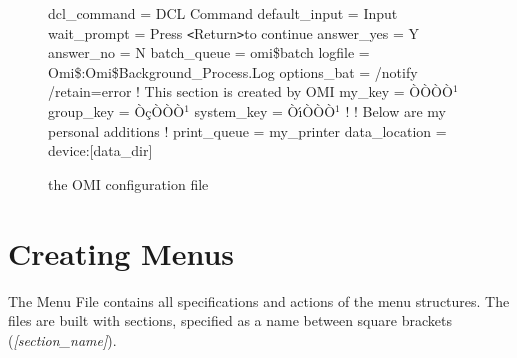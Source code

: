\documentclass[a4paper]{book}
\newcommand{\lt}{\texttt{<}}
\newcommand{\gt}{\texttt{>}}
\renewcommand{\indent}{\hspace*{5mm}}
\begin{document}
\begin{figure}[ht]
\begin{minipage}[t]{\textwidth}
\begin{ttfamily}
\indent dcl{\_}command = DCL Command \newline
\indent default{\_}input = Input \newline
\indent wait{\_}prompt = Press \lt Return\gt  to continue \newline
\indent answer{\_}yes = Y \newline
\indent answer{\_}no = N \newline
 \newline
\noindent[bgrprocess] \newline
\indent batch{\_}queue = omi{\$}batch \newline
\indent logfile = Omi{\$}:Omi{\$}Background{\_}Process.Log \newline
\indent options{\_}bat = /notify /retain=error \newline
 \newline
\noindent[keyring] ! This section is created by OMI \newline
\indent my{\_}key = \`{O}\`{O}\`{O}\`{O}$^{1}$ \newline
\indent group{\_}key = \`{O}\c{c}\`{O}\`{O}\`{O}$^{1}$ \newline
\indent system{\_}key = \`{O}\'{\i}\`{O}\`{O}\`{O}$^{1}$ \newline
 \newline
\noindent! \newline
\noindent! Below are my personal additions \newline
\noindent! \newline
\noindent[mydefs] \newline
\indent print{\_}queue = my{\_}printer \newline
\indent data{\_}location = device:[data{\_}dir] \newline
\end{ttfamily} \newline
\caption{the OMI configuration file}\label{fig:omiconfig}
\hrulefill
\end{minipage}
\end{figure}

\chapter{Creating Menus}
\label{sec:creating}

The Menu File contains all specifications and actions of the menu 
structures. The files are built with sections, specified as a name between 
square brackets (\textsl{[section{\_}name]}).
\end{document}
